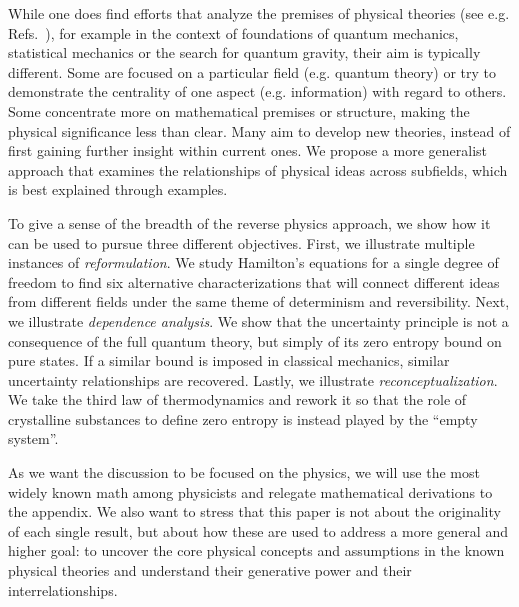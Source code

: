 \documentclass[10pt,twocolumn, nofootinbib]{revtex4-2}
\begin{document}
While one does find efforts that analyze the premises of physical theories (see e.g. Refs.~\cite{chiribella2011informational, selby2021reconstructing, giles2016mathematical, boyling1972axiomatic, PhysRev.101.860, Haag1964848, axiomaticQFT1975, masanes2019measurement, carcassi2021four}), for example in the context of foundations of quantum mechanics, statistical mechanics or the search for quantum gravity, their aim is typically different. Some are focused on a particular field (e.g. quantum theory) or try to demonstrate the centrality of one aspect (e.g. information) with regard to others. Some concentrate more on mathematical premises or structure, making the physical significance less than clear. Many aim to develop new theories, instead of first gaining further insight within current ones. We propose a more generalist approach that examines the relationships of physical ideas across subfields, which is best explained through examples. 


To give a sense of the breadth of the reverse physics approach, we show how it can be used to pursue three different objectives. First, we illustrate multiple instances of \emph{reformulation}. We study Hamilton's equations for a single degree of freedom to find six alternative characterizations that will connect different ideas from different fields under the same theme of determinism and reversibility. Next, we illustrate \emph{dependence analysis}. We show that the uncertainty principle is not a consequence of the full quantum theory, but simply of its zero entropy bound on pure states. If a similar bound is imposed in classical mechanics, similar uncertainty relationships are recovered. Lastly, we illustrate \emph{reconceptualization}. We take the third law of thermodynamics and rework it so that the role of crystalline substances to define zero entropy is instead played by the ``empty system''.

As we want the discussion to be focused on the physics, we will use the most widely known math among physicists and relegate mathematical derivations to the appendix. We also want to stress that this paper is not about the originality of each single result, but about how these are used to address a more general and higher goal: to uncover the core physical concepts and assumptions in the known physical theories and understand their generative power and their interrelationships. 




\end{document}
